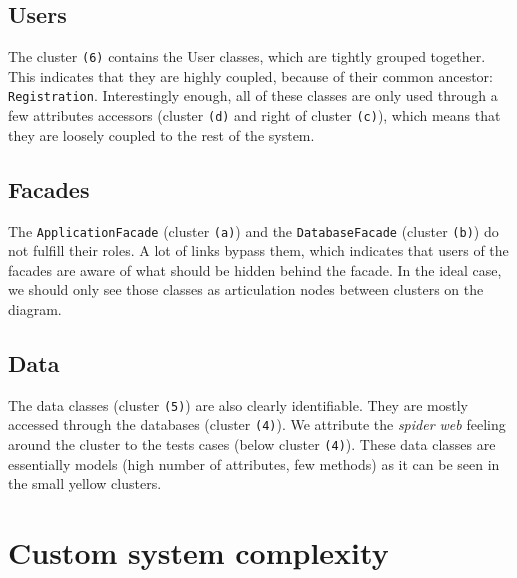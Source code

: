 \subsection{Users}
The cluster \texttt{(6)} contains the User classes, which are tightly grouped together. This indicates that they are highly coupled, because of their common ancestor: \texttt{Registration}. Interestingly enough, all of these classes are only used through a few attributes accessors (cluster \texttt{(d)} and right of cluster \texttt{(c)}), which means that they are loosely coupled to the rest of the system.

\subsection{Facades}
The \texttt{ApplicationFacade} (cluster \texttt{(a)}) and the \texttt{DatabaseFacade} (cluster \texttt{(b)}) do not fulfill their roles. A lot of links bypass them, which indicates that users of the facades are aware of what should be hidden behind the facade. In the ideal case, we should only see those classes as articulation nodes between clusters on the diagram.

\subsection{Data}
The data classes (cluster \texttt{(5)}) are also clearly identifiable. They are mostly accessed through the databases (cluster \texttt{(4)}). We attribute the \textit{spider web} feeling around the cluster to the tests cases (below cluster \texttt{(4)}). These data classes are essentially models (high number of attributes, few methods) as it can be seen in the small yellow clusters.

\section{Custom system complexity}

